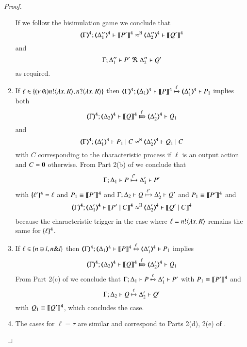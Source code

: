 \begin{proof}
\begin{enumerate}
		If we follow the bisimulation game we conclude that
		\[
		\horel{\tmap{\Gamma}{4}}{\tmap{\Delta_1''}{4}}{\pmap{P'}{4}}{\hwb}{\tmap{\Delta_2''}{4}}{\pmap{Q'}{4}}
		\]
		and
		\[
		\horel{\Gamma}{\Delta_1''}{P'}{\ \Re\ }{\Delta_2''}{Q'}
		\]
		as required.
		\item	If $\ell \in \{(\nu\, \tilde{m}) n ! \langle \lambda x.\,R \rangle, n ? \langle \lambda x.\,R \rangle\}$
				then
				$
				\horel{\tmap{\Gamma}{4}}{\tmap{\Delta_1}{4}}{\pmap{P}{4}}{\hby{\ell}}{\tmap{\Delta_1'}{4}}{P_1}
				$
				implies both 
				\[
				\horel{\tmap{\Gamma}{4}}{\tmap{\Delta_2}{4}}{\pmap{Q}{4}}{\Hby{\ell}}{\tmap{\Delta_2'}{4}}{Q_1}
				\]
				and
				\[
				\horel{\tmap{\Gamma}{4}}{\tmap{\Delta_1'}{4}}{P_1 \Par C}{\hwb}{\tmap{\Delta_2'}{4}}{Q_1 \Par C}
				\]
				with $C$ corresponding to the characteristic process if $\ell$ is an output action and $C = \mathbf{0}$ otherwise.
				From Part 2(b) of  we conclude that
				$$\Gamma; \Delta_1 \vdash P \xmapsto{\ell'} \Delta_1' \vdash P'$$
				with $\{\!\!\{\ell'\}\!\!\}^{\mathtt{4}} = \ell$ and $P_1 \equiv \llbracket P'\rrbracket^\mathtt{4}$
				and
				$\Gamma; \Delta_2 \vdash Q \xmapsto{\ell'} \Delta_2' \vdash Q'$
				and $P_1 \equiv \llbracket P'\rrbracket^\mathtt{4}$ and
				\begin{eqnarray*}
					\horel{\tmap{\Gamma}{4}}{\tmap{\Delta_1'}{4}}{\pmap{P' \Par C}{4}}{\hwb}{\tmap{\Delta_2'}{4}}{\pmap{Q' \Par C}{4}}
				\end{eqnarray*}
				because the characteristic trigger in the case where $\ell = n ! \langle \lambda x.\,R \rangle$ remains the same
				for $\{\!\!\{\ell\}\!\!\}^{\mathtt{4}}$.
				
		\item	If $\ell \in \{n \oplus l, n \& l\}$
				then
				$
				\horel{\tmap{\Gamma}{4}}{\tmap{\Delta_1}{4}}{\pmap{P}{4}}{\hby{\ell}}{\tmap{\Delta_1'}{4}}{P_1}
				$
				implies
				\[
				\horel{\tmap{\Gamma}{4}}{\tmap{\Delta_2}{4}}{\pmap{Q}{4}}{\Hby{\ell}}{\tmap{\Delta_2'}{4}}{Q_1}
				\]
				From Part 2(c) of  we conclude that
				$	
				\Gamma; \Delta_1 \vdash P \xmapsto{\ell} \Delta_1' \vdash P'
				$
				with $P_1 \equiv \llbracket P'\rrbracket^\mathtt{4}$
				and
				\[	
				\Gamma; \Delta_2 \vdash Q \xmapsto{\ell} \Delta_2' \vdash Q'
				\]
				with $Q_1 \equiv \llbracket Q'\rrbracket^\mathtt{4}$,
				which concludes the case.

		\item	The cases for $\ell = \tau$ are similar
				and correspond to Parts 2(d), 2(e) of .
	\end{enumerate}
			

\end{proof}
